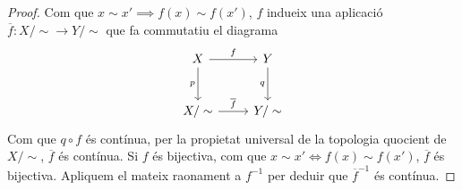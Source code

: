 \begin{proof}
	Com que $x\sim x' \implies f\left( x \right) \sim f\left( x' \right)$, $f$ indueix una aplicació $\overline{f}\colon X/\sim \rightarrow Y/\sim$ que fa commutatiu el diagrama
	\[
		\begin{tikzcd}
			X\ar{r}{f}\ar{d}[swap]{p} & Y\ar{d}[swap]{q}\\[2ex]
			X/\sim \ar{r}{\overline{f}} & Y/\sim
		\end{tikzcd}
	\]
	Com que $q\circ f$ \'es contínua, per la propietat universal de la topologia quocient de $X/\sim$, $\overline{f}$ \'es contínua. Si $f$ \'es bijectiva, com que $x\sim x' \iff f\left( x \right) \sim f\left( x' \right)$, $\overline{f}$ \'es bijectiva. Apliquem el mateix raonament a $f^{-1}$ per deduir que $\overline{f}^{-1}$ \'es contínua.
\end{proof}
